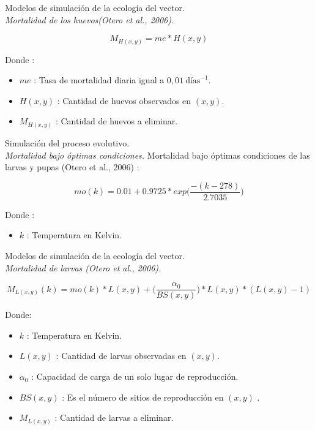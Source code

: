 \begin{frame}[c]{Modelos de simulación de la ecología del vector.\\\textit{Mortalidad de los huevos(Otero et al., 2006).}}
  \begin{center}
      \begin{equation}
          M_{H(x,y)} = me * H(x,y)
      \end{equation}
  \end{center}
  Donde :
    \begin{itemize}
      \item $me$ : Tasa de mortalidad diaria igual a $0,01\  \text{días}^{-1}$.
      \item $H(x, y)$ : Cantidad de huevos observados en $(x,y)$.
      \item $M_{H(x,y)}$ : Cantidad de huevos a eliminar.
    \end{itemize}
\end{frame}

\begin{frame}[c]{Simulación del proceso evolutivo. \\\textit{Mortalidad bajo óptimas condiciones.}}
  Mortalidad bajo óptimas condiciones de las larvas y pupas (Otero et al., 2006) :
  \begin{center}
    \begin{equation}
    \label{eq:mortalidad-natural-larvas}
        mo(k) = 0.01 + 0.9725 * exp\bigg( \frac{-(k - 278)}{2.7035}\bigg)
    \end{equation}
  \end{center}
  Donde :
    \begin{itemize}
      \item $k$ : Temperatura en Kelvin.
    \end{itemize}
\end{frame}

\begin{frame}[c]{Modelos de simulación de la ecología del vector.\\\textit{Mortalidad de larvas (Otero et al., 2006).}}
  \begin{center}
      \begin{equation}
      M_{L(x,y)}(k) = mo(k) * L(x,y) + \bigg(\frac{\alpha _{0}}{BS(x,y)}\bigg) * L(x,y) *(L(x,y) - 1)
    \end{equation}
  \end{center}
  Donde:
 \begin{itemize}
      \item $k$ : Temperatura en Kelvin.
      \item $L(x, y)$ : Cantidad de larvas observadas en $(x,y)$.
      \item $\alpha _{0}$ : Capacidad de carga de un solo lugar de reproducción.
      \item $BS(x,y)$ : Es el número de sitios de reproducción en $(x,y)$ .
      \item $M_{L(x,y)}$ : Cantidad de larvas a eliminar.
    \end{itemize}
\end{frame}

